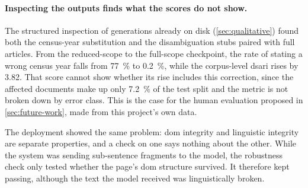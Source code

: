 \paragraph{Inspecting the outputs finds what the scores do not show.}
The structured inspection of generations already on disk (\cref{sec:qualitative}) found both the census-year substitution and the disambiguation stubs paired with full articles.
From the reduced-scope to the full-scope checkpoint, the rate of stating a wrong census year falls from \qty{77}{\percent} to \qty{0.2}{\percent}, while the corpus-level \gls{dsari} rises by \num{3.82}.
That score cannot show whether its rise includes this correction, since the affected documents make up only \qty{7.2}{\percent} of the test split and the metric is not broken down by error class.
This is the case for the human evaluation proposed in \cref{sec:future-work}, made from this project's own data.

The deployment showed the same problem: \gls{dom} integrity and linguistic integrity are separate properties, and a check on one says nothing about the other.
While the system was sending sub-sentence fragments to the model, the robustness check only tested whether the page's \gls{dom} structure survived.
It therefore kept passing, although the text the model received was linguistically broken.

